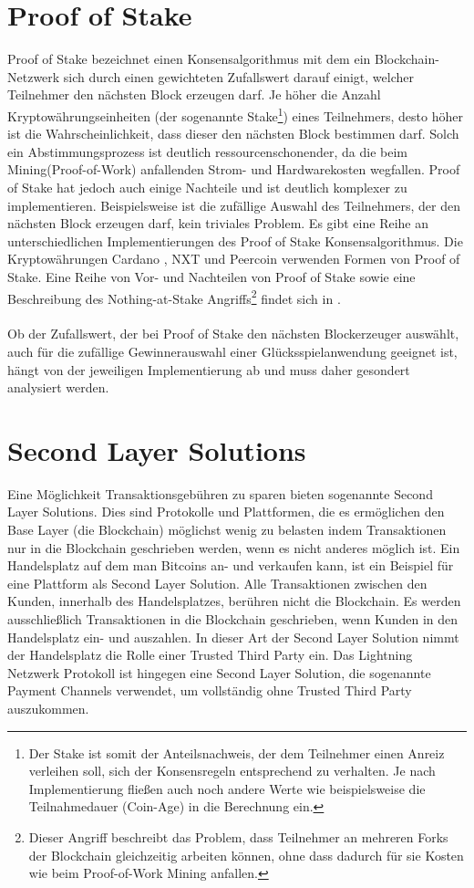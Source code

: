 \section{Proof of Stake }\label{pos}
Proof of Stake bezeichnet einen Konsensalgorithmus mit dem ein Blockchain-Netzwerk sich durch einen gewichteten Zufallswert darauf einigt, welcher Teilnehmer den nächsten Block erzeugen darf. Je höher die Anzahl Kryptowährungseinheiten (der sogenannte Stake\footnote{Der Stake ist somit der Anteilsnachweis, der dem Teilnehmer einen Anreiz verleihen soll, sich der Konsensregeln entsprechend zu verhalten. Je nach Implementierung fließen auch noch andere Werte wie beispielsweise die Teilnahmedauer (Coin-Age) in die Berechnung ein.}) eines Teilnehmers, desto höher ist die Wahrscheinlichkeit, dass dieser den nächsten Block bestimmen darf. Solch ein Abstimmungsprozess ist deutlich ressourcenschonender, da die beim Mining(Proof-of-Work) anfallenden Strom- und Hardwarekosten wegfallen. Proof of Stake hat jedoch auch einige Nachteile und ist deutlich komplexer zu implementieren. Beispielsweise ist die zufällige Auswahl des Teilnehmers, der den nächsten Block erzeugen darf, kein triviales Problem. Es gibt eine Reihe an unterschiedlichen Implementierungen des Proof of Stake Konsensalgorithmus. Die Kryptowährungen Cardano \cite{coin_ada}, NXT \cite{coin_nxt} und Peercoin \cite{coin_peercoin} verwenden Formen von Proof of Stake. Eine Reihe von Vor- und Nachteilen von Proof of Stake sowie eine Beschreibung des Nothing-at-Stake Angriffs\footnote{Dieser Angriff beschreibt das Problem, dass Teilnehmer an mehreren Forks der Blockchain gleichzeitig arbeiten können, ohne dass dadurch für sie Kosten wie beim Proof-of-Work Mining anfallen.} findet sich in \cite{proof_of_stake}.\\\\
Ob der Zufallswert, der bei Proof of Stake den nächsten Blockerzeuger auswählt, auch für die zufällige Gewinnerauswahl einer Glücksspielanwendung geeignet ist, hängt von der jeweiligen Implementierung ab und muss daher gesondert analysiert werden.

\section{Second Layer Solutions}
Eine Möglichkeit Transaktionsgebühren zu sparen bieten sogenannte Second Layer Solutions. Dies sind Protokolle und Plattformen, die es ermöglichen den Base Layer (die Blockchain) möglichst wenig zu belasten indem Transaktionen nur in die Blockchain geschrieben werden, wenn es nicht anderes möglich ist. Ein Handelsplatz auf dem man Bitcoins an- und verkaufen kann, ist ein Beispiel für eine Plattform als Second Layer Solution. Alle Transaktionen zwischen den Kunden, innerhalb des Handelsplatzes, berühren nicht die Blockchain. Es werden ausschließlich Transaktionen in die Blockchain geschrieben, wenn Kunden in den Handelsplatz ein- und auszahlen. In dieser Art der Second Layer Solution nimmt der Handelsplatz die Rolle einer Trusted Third Party ein. Das Lightning Netzwerk Protokoll ist hingegen eine Second Layer Solution, die sogenannte Payment Channels verwendet, um vollständig ohne Trusted Third Party auszukommen.

